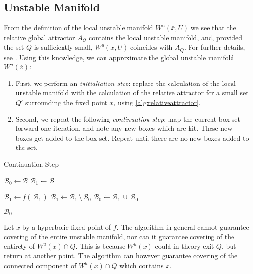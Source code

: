 
\subsection{Unstable Manifold}

From the definition of the local unstable manifold $W^u(\bar{x}, U)$ we see that the 
relative global attractor $A_Q$ contains the local unstable manifold, and, provided the 
set $Q$ is sufficiently small, $W^u(\bar{x}, U)$ coincides with $A_Q$. For further 
details, see \cite*{manifold, geodynbook}. Using this knowledge, we can approximate the 
global unstable manifold $W^u(\bar{x})$: 

\begin{enumerate}
    \item First, we perform an \emph{initialiation step}: replace the calculation of 
    the local unstable manifold with the calculation of the relative
    attractor for a small set $Q'$ surrounding the fixed point $\bar{x}$, using 
    \autoref{alg:relativeattractor}. 
    \item Second, we repeat the following \emph{continuation step}: map 
    the current box set forward one iteration, and note any new boxes which are hit. These 
    new boxes get added to the box set. Repeat until there are no new boxes
    added to the set. 
\end{enumerate}

\begin{algorithm}
    \caption{Continuation Step}
    \label{alg:manifold}

    \begin{algorithmic}[1]
        \State $\mathcal{B}_0 \gets \mathcal{B}$
        \State $\mathcal{B}_1 \gets \mathcal{B}$

            \State $\mathcal{B}_1 \gets f(\,\mathcal{B}_1\,)$
            \label{alg:manifold:map}
            \State $\mathcal{B}_1 \gets \mathcal{B}_1\, \setminus\, \mathcal{B}_0$
            \State $\mathcal{B}_0 \gets \mathcal{B}_1\, \cup\, \mathcal{B}_0$
        \EndWhile

        \State \Return $\mathcal{B}_0$
    \end{algorithmic}
\end{algorithm}

\begin{proposition}
    \cite*{manifold} Let $\bar{x}$ by a hyperbolic fixed point of $f$.
    The algorithm in general cannot guarantee covering of the 
    entire unstable manifold, nor can it guarantee covering of the entirety of 
    $W^u(\bar{x}) \cap Q$. This is because $W^u(\bar{x})$ could in theory exit $Q$, 
    but return at another point. The algorithm can however guarantee covering 
    of the connected component of $W^u(\bar{x}) \cap Q$ which contains $\bar{x}$.
\end{proposition}
    
